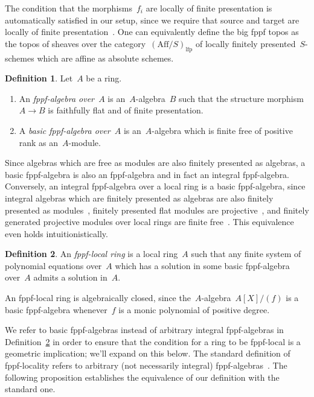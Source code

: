 \documentclass[10pt,reqno,a4paper]{amsbook}
\theoremstyle{definition}
\newtheorem{defn}{Definition}[section]
\theoremstyle{plain}
\theoremstyle{remark}
\newcommand{\Aff}{\mathrm{Aff}}
\newcommand{\lfp}{\mathrm{lfp}}
\newcommand{\?}{\,{:}\,}
\renewcommand{\_}{\mathpunct{.}\,}
\newcommand{\stacksproject}[1]{\cite[{\href{http://stacks.math.columbia.edu/tag/#1}{Tag~#1}}]{stacks-project}}
\begin{document}
The condition that the morphisms~$f_i$ are locally of finite presentation is
automatically satisfied in our setup, since we require that source and target
are locally of finite presentation~\stacksproject{02FV}. One can equivalently
define the big fppf topos as the topos of sheaves over the
category~$(\Aff/S)_\lfp$ of locally finitely presented~$S$-schemes which are
affine as absolute schemes.

\begin{defn}Let~$A$ be a ring.
\begin{enumerate}
\item An \emph{fppf-algebra over~$A$} is an~$A$-algebra~$B$ such that the
structure morphism~$A \to B$ is faithfully flat and of finite presentation.
\item A \emph{basic fppf-algebra over~$A$} is an~$A$-algebra which
is finite free of positive rank as an~$A$-module.
\end{enumerate}
\end{defn}

Since algebras which are free as modules are also finitely presented as
algebras, a basic fppf-algebra is also an fppf-algebra and in fact an integral
fppf-algebra. Conversely, an integral fppf-algebra over a local ring is a basic
fppf-algebra, since integral algebras which are finitely presented as algebras
are also finitely presented as modules~\stacksproject{0564}, finitely presented
flat modules are projective~\stacksproject{058R}, and finitely generated
projective modules over local rings are finite free~\stacksproject{00NX}. This
equivalence even holds intuitionistically.

\begin{defn}\label{defn:fppf-local-ring}
An \emph{fppf-local ring} is a local ring~$A$ such that any finite system of
polynomial equations over~$A$ which has a solution in some basic fppf-algebra
over~$A$ admits a solution in~$A$.
\end{defn}

An fppf-local ring is algebraically closed, since
the~$A$-algebra~$A[X]/(f)$ is a basic fppf-algebra whenever~$f$ is a monic polynomial
of positive degree.

We refer to basic fppf-algebras instead of arbitrary integral fppf-algebras in
Definition~\ref{defn:fppf-local-ring} in order to ensure that the condition for
a ring to be fppf-local is a geometric implication; we'll expand on this below.
The standard definition of fppf-locality refers to arbitrary (not necessarily
integral) fppf-algebras~\cite[Definition~4.1]{schroer:points-fppf}. The
following proposition establishes the equivalence of our definition with the
standard one.
\end{document}
